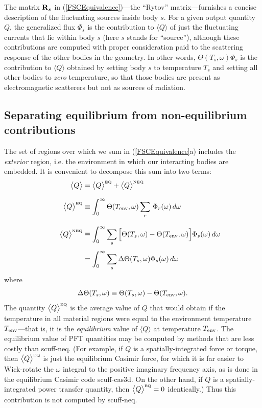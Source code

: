 \documentclass[letterpaper]{article}
\begin{document}
The matrix $\mathbf{R}_s$ in (\ref{FSCEquivalence})---the ``Rytov''
matrix---furnishes a concise description of the fluctuating sources
inside body $s$. For a given output quantity 
$Q$, the generalized flux $\Phi_s$ is the contribution to 
$\langle Q \rangle$ 
of just the fluctuating currents that lie within body $s$
(here $s$ stands for ``source''), although these contributions
are computed with proper consideration paid to the scattering
response of the other bodies in the geometry. In other words,
$\Theta(T_s,\omega)\Phi_s$ is the contribution to 
$\langle Q \rangle$ 
obtained by setting body $s$ to temperature $T_s$ and setting
all other bodies to \textit{zero} temperature, so that those
bodies are present as electromagnetic scatterers but not as 
sources of radiation.

\subsection*{Separating equilibrium from non-equilibrium contributions}

The set of regions over which we sum in (\ref{FSCEquivalence}a) includes
the \textit{exterior} region, i.e. the environment in which
our interacting bodies are embedded. It is convenient to
decompose this sum into two terms:
\begin{align}
 \big\langle Q\big\rangle
&= \big\langle Q\big\rangle^{\hbox{\tiny{EQ}}} +
   \big\langle Q\big\rangle^{\hbox{\tiny{NEQ}}}
\\[8pt]
 \big\langle Q\big\rangle^{\hbox{\tiny{EQ}}}
&\equiv 
  \int_0^\infty \Theta(T_{\hbox{\scriptsize{env}}},\omega) \sum_r \,
                   \Phi_r(\omega)\,d\omega 
\\[8pt]
 \qquad \big\langle Q\big\rangle^{\hbox{\tiny{NEQ}}}
&\equiv 
  \int_0^\infty \sum_s 
  \Big[ \Theta(T_s, \omega) - \Theta(T_{\hbox{\scriptsize{env}}},\omega)\Big]
        \Phi_s(\omega)\,d\omega 
\\[4pt]
&=
  \int_0^\infty \sum_s
  \Delta \Theta(T_s, \omega) \Phi_s(\omega)\,d\omega 
\label{QNEQ}
\end{align}
where 
$$ \Delta \Theta(T_s, \omega) \equiv 
   \Theta(T_s, \omega) - \Theta(T_{\hbox{\scriptsize{env}}},\omega).
$$
The quantity $\big\langle Q\big\rangle^{\hbox{\tiny{EQ}}}$
is the average value of $Q$ that would obtain if 
the temperature in all material regions were equal
to the environment temperature $T_{\hbox{\scriptsize{env}}}$---that is,
it is the \textit{equilibrium} value of $\big\langle Q\big\rangle$
at temperature $T_{\hbox{\scriptsize{env}}}$. The equilibrium value
of PFT quantities may be computed by methods that are 
less costly than {\sc scuff-neq}. (For example,
if $Q$ is a spatially-integrated force or torque, then 
$\big\langle Q\big \rangle^{\hbox{\tiny{EQ}}}$ is just the equilibrium
Casimir force, for which it is far easier to
Wick-rotate the $\omega$ integral to the positive
imaginary frequency axis, as is done in the
equilibrium Casimir code {\sc scuff-cas3d}. 
On the other hand, if $Q$ is a spatially-integrated
power transfer quantity, then 
$\big\langle Q\big \rangle^{\hbox{\tiny{EQ}}}=0$ identically.)
Thus this contribution is not computed by {\sc scuff-neq}.
\end{document}
